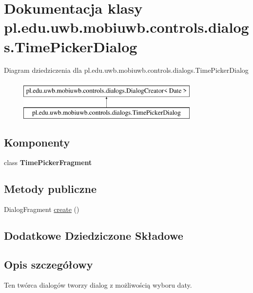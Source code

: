 \hypertarget{classpl_1_1edu_1_1uwb_1_1mobiuwb_1_1controls_1_1dialogs_1_1_time_picker_dialog}{}\section{Dokumentacja klasy pl.\+edu.\+uwb.\+mobiuwb.\+controls.\+dialogs.\+Time\+Picker\+Dialog}
\label{classpl_1_1edu_1_1uwb_1_1mobiuwb_1_1controls_1_1dialogs_1_1_time_picker_dialog}
Diagram dziedziczenia dla pl.\+edu.\+uwb.\+mobiuwb.\+controls.\+dialogs.\+Time\+Picker\+Dialog\begin{figure}[H]
\begin{center}
\leavevmode
\includegraphics[height=2.000000cm]{classpl_1_1edu_1_1uwb_1_1mobiuwb_1_1controls_1_1dialogs_1_1_time_picker_dialog}
\end{center}
\end{figure}
\subsection*{Komponenty}
\begin{DoxyCompactItemize}
\item 
class {\bfseries Time\+Picker\+Fragment}
\end{DoxyCompactItemize}
\subsection*{Metody publiczne}
\begin{DoxyCompactItemize}
\item 
Dialog\+Fragment \hyperlink{classpl_1_1edu_1_1uwb_1_1mobiuwb_1_1controls_1_1dialogs_1_1_time_picker_dialog_a94e290c3f9e893d3113319f904f5b166}{create} ()
\end{DoxyCompactItemize}
\subsection*{Dodatkowe Dziedziczone Składowe}


\subsection{Opis szczegółowy}
Ten twórca dialogów tworzy dialog z możliwością wyboru daty. 

